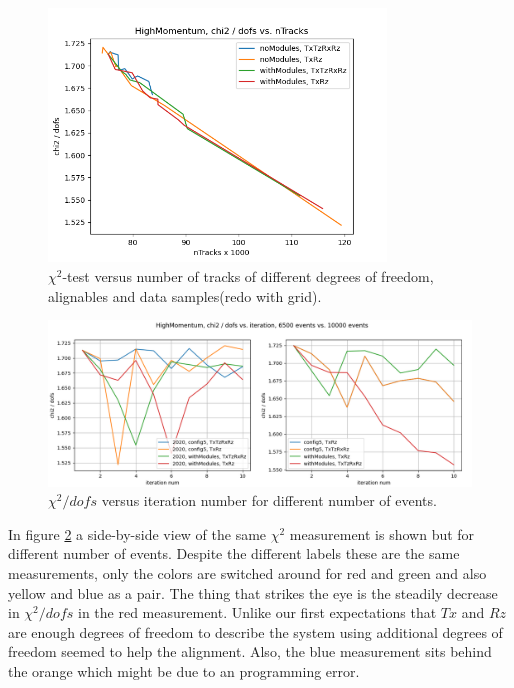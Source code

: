 \begin{figure}
  \centering
  \includegraphics[width=0.8\textwidth]{plots/nov_21/chi2_vs_ntracks_all.png}
  \caption{$\chi^2$-test versus number of tracks of different degrees of freedom, alignables and data samples(redo with grid).}
  \label{fig:chi2tracks}
\end{figure}

\begin{figure}
  \centering
  \includegraphics[width=\textwidth]{plots/LHCB_week_dec/chi2_vs_iter_normal.png}
  \caption{$\chi^2 / dofs$ versus iteration number for different number of events.}
  \label{fig:chi2iterdec}
\end{figure}

In figure \ref{fig:chi2iterdec} a side-by-side view of the same $\chi^2$ measurement
is shown but for different number of events. Despite the different labels these are the same measurements, only the colors are switched around for red and green and also yellow and blue as a pair. The thing that strikes the eye is the steadily decrease in $\chi^2 / dofs$ in the red measurement. Unlike our first expectations that $Tx$ and $Rz$ are enough degrees of freedom to describe the system using additional degrees of freedom seemed to help the alignment.
Also, the blue measurement sits behind the orange which might be due to an
programming error.

